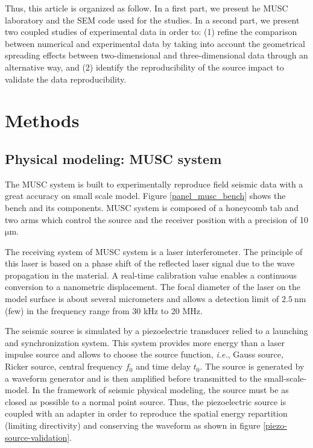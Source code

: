 \documentclass[manuscript,revised]{geophysics}
\newcommand{\twod}{two-dimensional }
\newcommand{\thrd}{three-dimensional }
\begin{document}
	
\noindent Thus, this article is organized as follow. In a first part, we present he MUSC laboratory and the SEM code used for the studies. In a second part, we present two coupled studies of experimental data in order to: (1) refine the comparison between numerical and experimental data by taking into account the geometrical spreading effects between \twod and \thrd data through an alternative way, and (2) identify the reproducibility of the source impact to validate the data reproducibility.


\section{Methods}

\subsection{Physical modeling: MUSC system}

\noindent The MUSC system \citep{Bretaudeau_SSA_2008b,Bretaudeau_SSM_2011,Bretaudeau_FWI_2013} is built to experimentally reproduce field seismic data with a great accuracy on small scale model. Figure \ref{panel_musc_bench} shows the bench and its components. MUSC system is composed of a honeycomb tab and two arms which control the source and the receiver position with a precision of 10 $\mathrm{\mu m}$.

\noindent The receiving system of MUSC system is a laser interferometer. The principle of this laser is based on a phase shift of the reflected laser signal due to the wave propagation in the material. A real-time calibration value enables a continuous conversion to a nanometric displacement. The focal diameter of the laser on the model surface is about several micrometers and allows a detection limit of $\mathrm{2.5\ nm}$ (few) in the frequency range from 30 kHz to 20 MHz.

\noindent The seismic source is simulated by a piezoelectric transducer relied to a launching and synchronization system. This system provides more energy than a laser impulse source \citep{Bretaudeau_PHD_2010,Bretaudeau_SSM_2011} and allows to choose the source function, \textit{i.e.}, Gauss source, Ricker source, central frequency $f_{0}$ and time delay $t_{0}$. The source is generated by a waveform generator and is then amplified before transmitted to the small-scale-model. In the framework of seismic physical modeling, the source must be as closed as possible to a normal point source. Thus, the piezoelectric source is coupled with an adapter in order to reproduce the spatial energy repartition (limiting directivity) and conserving the waveform as shown in figure \ref{piezo-source-validation}.
\end{document}
